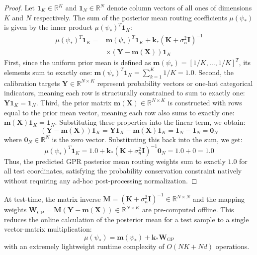 \begin{proof}
Let $\mathbf{1}_K \in \mathbb{R}^K$ and $\mathbf{1}_N \in \mathbb{R}^N$ denote column vectors of all ones of dimensions $K$ and $N$ respectively. The sum of the posterior mean routing coefficients $\mu(\psi_*)$ is given by the inner product $\mu(\psi_*)^T \mathbf{1}_K$:
\begin{equation}
\begin{aligned}
\mu(\psi_*)^T \mathbf{1}_K = {} & \mathbf{m}(\psi_*)^T \mathbf{1}_K + \mathbf{k}_* \left( \mathbf{K} + \sigma_n^2 \mathbf{I} \right)^{-1} \\
& \times \left( \mathbf{Y} - \mathbf{m}(\mathbf{X}) \right) \mathbf{1}_K
\end{aligned}
\end{equation}
First, since the uniform prior mean is defined as $\mathbf{m}(\psi_*) = [1/K, \dots, 1/K]^T$, its elements sum to exactly one: $\mathbf{m}(\psi_*)^T \mathbf{1}_K = \sum_{k=1}^K 1/K = 1.0$.
Second, the calibration targets $\mathbf{Y} \in \mathbb{R}^{N \times K}$ represent probability vectors or one-hot categorical indicators, meaning each row is structurally constrained to sum to exactly one: $\mathbf{Y} \mathbf{1}_K = \mathbf{1}_N$.
Third, the prior matrix $\mathbf{m}(\mathbf{X}) \in \mathbb{R}^{N \times K}$ is constructed with rows equal to the prior mean vector, meaning each row also sums to exactly one: $\mathbf{m}(\mathbf{X}) \mathbf{1}_K = \mathbf{1}_N$.
Substituting these properties into the linear term, we obtain:
\begin{equation}
\left( \mathbf{Y} - \mathbf{m}(\mathbf{X}) \right) \mathbf{1}_K = \mathbf{Y} \mathbf{1}_K - \mathbf{m}(\mathbf{X}) \mathbf{1}_K = \mathbf{1}_N - \mathbf{1}_N = \mathbf{0}_N
\end{equation}
where $\mathbf{0}_N \in \mathbb{R}^N$ is the zero vector. Substituting this back into the sum, we get:
\begin{equation}
\mu(\psi_*)^T \mathbf{1}_K = 1.0 + \mathbf{k}_* \left( \mathbf{K} + \sigma_n^2 \mathbf{I} \right)^{-1} \mathbf{0}_N = 1.0 + 0 = 1.0
\end{equation}
Thus, the predicted GPR posterior mean routing weights sum to exactly $1.0$ for all test coordinates, satisfying the probability conservation constraint natively without requiring any ad-hoc post-processing normalization.
\end{proof}

At test-time, the matrix inverse $\mathbf{M} = \left(\mathbf{K} + \sigma_n^2 \mathbf{I}\right)^{-1} \in \mathbb{R}^{N \times N}$ and the mapping weights $\mathbf{W}_{\text{GP}} = \mathbf{M} \left(\mathbf{Y} - \mathbf{m}(\mathbf{X})\right) \in \mathbb{R}^{N \times K}$ are pre-computed offline. This reduces the online calculation of the posterior mean for a test sample to a single vector-matrix multiplication:
\begin{equation}
\mu(\psi_*) = \mathbf{m}(\psi_*) + \mathbf{k}_* \mathbf{W}_{\text{GP}}
\end{equation}
with an extremely lightweight runtime complexity of $O(NK + Nd)$ operations.

